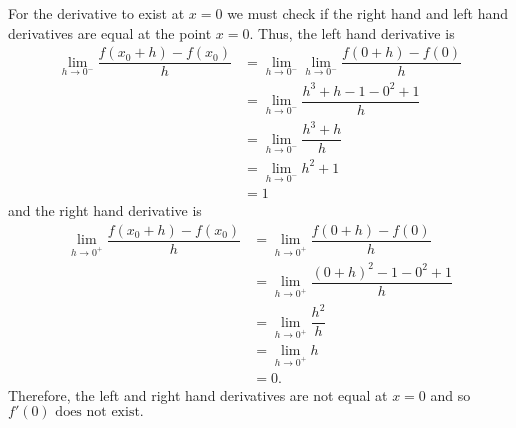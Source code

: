 \documentclass{hwset}
\begin{document}
\be
	\item
	\begin{solution}
		For the derivative to exist at $x=0$ we must check if the right hand and
		left hand derivatives are equal at the point $x=0$. Thus, the left hand
		derivative is
		\begin{align*}
			\lim_{h\to 0^-} \dfrac{f(x_0+h) - f(x_0)}{h} &= \lim_{h\to 0^-}
				\lim_{h\to 0^-} \dfrac{f(0+h) - f(0)}{h} \\
			&= \lim_{h\to 0^-} \dfrac{h^3 + h - 1 - 0^2 + 1}{h} \\
			&= \lim_{h\to 0^-} \dfrac{h^3 + h}{h} \\
			&= \lim_{h\to 0^-} h^2 + 1 \\
			&= 1 
		\end{align*}
		and the right hand derivative is
		\begin{align*}
			\lim_{h\to 0^+} \dfrac{f(x_0+h) - f(x_0)}{h} &= 
				\lim_{h\to 0^+} \dfrac{f(0+h) - f(0)}{h} \\
			&=\lim_{h\to 0^+} \dfrac{(0+h)^2 - 1 - 0^2 + 1}{h} \\
			&= \lim_{h\to 0^+} \dfrac{h^2}{h} \\
			&= \lim_{h\to 0^+} h \\
			&= 0. 
		\end{align*}
		Therefore, the left and right hand derivatives are not equal at $x=0$ and so
		$\boxed{f'(0) \text{ does not exist.}}$
	\end{solution}
	\item
\end{document}
